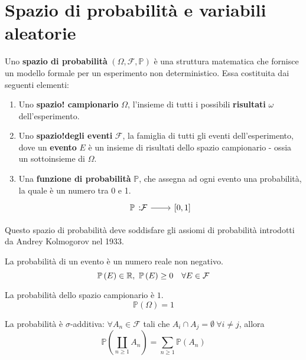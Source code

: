 \section{Spazio di probabilità e variabili aleatorie}
\begin{define}
	Uno \textbf{spazio di probabilità} $\left(\Omega,\mathcal{F},\mathbb{P}\right)$ è una struttura matematica che fornisce un modello formale per un esperimento non deterministico. Essa costituita dai seguenti elementi:
	\begin{enumerate}
		\item Uno \textbf{spazio! campionario} $\Omega$, l'insieme di tutti i possibili \textbf{risultati} $\omega$ dell'esperimento.
		\item Uno \textbf{spazio!degli eventi} $\mathcal{F}$, la famiglia di tutti gli eventi dell'esperimento, dove un \textbf{evento} $E$ è un insieme di risultati dello spazio campionario - ossia un sottoinsieme di $\Omega$.
		\item Una \textbf{funzione di probabilità} $\mathbb{P}$, che assegna ad ogni evento una probabilità, la quale è un numero tra 0 e 1.
		\begin{equation}
			\funz{\mathbb{P}}{\mathcal{F}}{\left[0,1\right]}
		\end{equation}
	\end{enumerate}
\end{define}
Questo spazio di probabilità deve soddisfare gli assiomi di probabilità introdotti da Andrey Kolmogorov nel 1933.
\begin{axiom}
	La probabilità di un evento è un numero reale non negativo.
	\begin{equation}
		\mathbb{P}\left(E\right)\in\realset,\ \mathbb{P}\left(E\right)\geq 0\quad \forall E\in\mathcal{F} 
	\end{equation}
\end{axiom}
\begin{axiom}
	La probabilità dello spazio campionario è $1$.
	\begin{equation}
		\mathbb{P}\left(\Omega\right)=1
	\end{equation}
\end{axiom}
\begin{axiom}
	La probabilità è $\sigma$-additiva:	$\forall A_n\in\mathcal{F}$ tali che $A_i\cap A_j=\emptyset\ \forall i\neq j$, allora
	\begin{equation}
		\mathbb{P}\left(\coprod_{n\geq 1}A_n\right)=\sum_{n\geq 1}\mathbb{P}\left(A_n\right)
	\end{equation}
\end{axiom}

